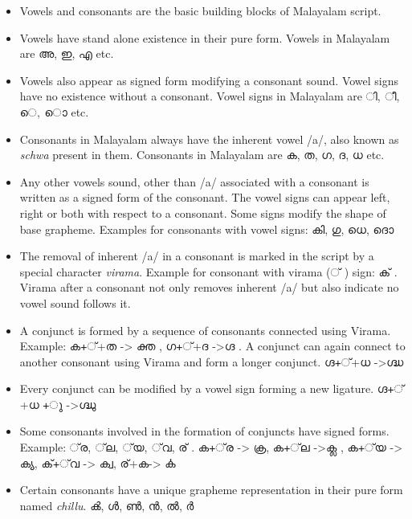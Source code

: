 \documentclass[10pt]{article}
\begin{document}
\begin{itemize}
	\item
	Vowels and consonants are the basic building blocks of Malayalam script.
	\item
	Vowels have stand alone existence in their pure form. Vowels in Malayalam are {\manjari അ, ഇ, എ }etc.
	\item
	Vowels also appear as signed form modifying a consonant sound. Vowel signs have no existence without a consonant. Vowel signs in Malayalam are {\manjari  ി, ീ, െ, ൊ }etc.
	\item Consonants in Malayalam always have the inherent vowel /a/, also known as \textit{schwa} present in them. Consonants in Malayalam are {\manjari ക, ത, ഗ, ദ, ധ }etc.
	\item
	Any other vowels sound, other than /a/  associated with a consonant is written as a signed form of the consonant. The vowel signs can  appear left, right or both with respect to a consonant. Some signs modify the shape of base grapheme. Examples for consonants with vowel signs:  {\manjari കി, ഗു, ധെ, ദൊ} 
	\item 
	The removal of inherent /a/ in a consonant is marked in the script by a special character \textit{virama}. Example for consonant with virama ({\manjari ് }) sign: {\manjari ക് }. Virama after a consonant not only removes inherent /a/ but also indicate no vowel sound follows it. 
	\item
	A conjunct is formed by  a sequence of consonants connected using Virama. Example: {\manjari ക+്+ത -> ക്ത , ഗ+്+ദ ->ഗ്ദ }. A conjunct can again connect to another consonant using Virama and form a longer conjunct. {\manjari ഗ്ദ+്+ധ ->ഗ്ദ്ധ }
	\item	
	Every conjunct can be modified by a vowel sign forming a new ligature. 
	{\manjari ഗ്ദ+്+ധ +ു ->ഗ്ദ്ധു }
	\item
	Some consonants involved in the formation of conjuncts have signed forms. Example: {\manjari ്‌ര, ്‌ല, ്‌യ, ്‌വ, ര് . ക+്‌ര -> ക്ര, ക+്‌ല ->ക്ല , ക+്‌യ -> ക്യ, ക്+്‌വ -> ക്വ, ര്+ക-> ൎക}
	\item 
	Certain consonants have a unique grapheme representation in their pure form named \textit{chillu}. {\manjari ൿ, ൾ, ൺ, ൻ, ൽ, ർ }
\end{itemize}
\end{document}
